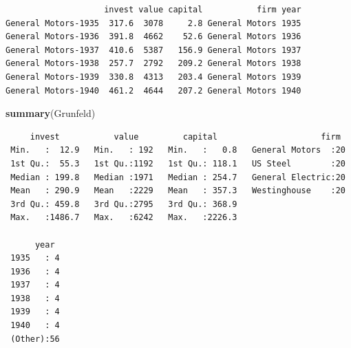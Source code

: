 \documentclass[12pt,brazil,oneside]{book}
\newenvironment{Shaded}{\begin{snugshade}}{\end{snugshade}}
\newcommand{\DataTypeTok}[1]{\textcolor[rgb]{0.13,0.29,0.53}{#1}}
\newcommand{\KeywordTok}[1]{\textcolor[rgb]{0.13,0.29,0.53}{\textbf{#1}}}
\newcommand{\NormalTok}[1]{#1}
\newcommand{\OperatorTok}[1]{\textcolor[rgb]{0.81,0.36,0.00}{\textbf{#1}}}
\newcommand{\StringTok}[1]{\textcolor[rgb]{0.31,0.60,0.02}{#1}}
\begin{document}
\begin{Shaded}
\end{Shaded}

\begin{verbatim}
                    invest value capital           firm year
General Motors-1935  317.6  3078     2.8 General Motors 1935
General Motors-1936  391.8  4662    52.6 General Motors 1936
General Motors-1937  410.6  5387   156.9 General Motors 1937
General Motors-1938  257.7  2792   209.2 General Motors 1938
General Motors-1939  330.8  4313   203.4 General Motors 1939
General Motors-1940  461.2  4644   207.2 General Motors 1940
\end{verbatim}

\begin{Shaded}
\begin{Highlighting}[]
\KeywordTok{summary}\NormalTok{(Grunfeld)}
\end{Highlighting}
\end{Shaded}

\begin{verbatim}
     invest           value         capital                     firm   
 Min.   :  12.9   Min.   : 192   Min.   :   0.8   General Motors  :20  
 1st Qu.:  55.3   1st Qu.:1192   1st Qu.: 118.1   US Steel        :20  
 Median : 199.8   Median :1971   Median : 254.7   General Electric:20  
 Mean   : 290.9   Mean   :2229   Mean   : 357.3   Westinghouse    :20  
 3rd Qu.: 459.8   3rd Qu.:2795   3rd Qu.: 368.9                        
 Max.   :1486.7   Max.   :6242   Max.   :2226.3                        
                                                                       
      year   
 1935   : 4  
 1936   : 4  
 1937   : 4  
 1938   : 4  
 1939   : 4  
 1940   : 4  
 (Other):56  
\end{verbatim}
\end{document}
